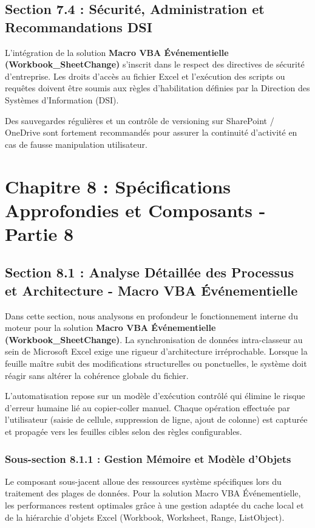 \documentclass[12pt,a4paper]{report}
\begin{document}
\section{Section 7.4 : Sécurité, Administration et Recommandations DSI}
L'intégration de la solution \textbf{Macro VBA Événementielle (Workbook\_SheetChange)} s'inscrit dans le respect des directives de sécurité d'entreprise. Les droits d'accès au fichier Excel et l'exécution des scripts ou requêtes doivent être soumis aux règles d'habilitation définies par la Direction des Systèmes d'Information (DSI).

Des sauvegardes régulières et un contrôle de versioning sur SharePoint / OneDrive sont fortement recommandés pour assurer la continuité d'activité en cas de fausse manipulation utilisateur.


\chapter{Chapitre 8 : Spécifications Approfondies et Composants - Partie 8}

\section{Section 8.1 : Analyse Détaillée des Processus et Architecture - Macro VBA Événementielle}
Dans cette section, nous analysons en profondeur le fonctionnement interne du moteur pour la solution \textbf{Macro VBA Événementielle (Workbook\_SheetChange)}. La synchronisation de données intra-classeur au sein de Microsoft Excel exige une rigueur d'architecture irréprochable. Lorsque la feuille maître subit des modifications structurelles ou ponctuelles, le système doit réagir sans altérer la cohérence globale du fichier.

L'automatisation repose sur un modèle d'exécution contrôlé qui élimine le risque d'erreur humaine lié au copier-coller manuel. Chaque opération effectuée par l'utilisateur (saisie de cellule, suppression de ligne, ajout de colonne) est capturée et propagée vers les feuilles cibles selon des règles configurables.


\subsection{Sous-section 8.1.1 : Gestion Mémoire et Modèle d'Objets}
Le composant sous-jacent alloue des ressources système spécifiques lors du traitement des plages de données. Pour la solution Macro VBA Événementielle, les performances restent optimales grâce à une gestion adaptée du cache local et de la hiérarchie d'objets Excel (Workbook, Worksheet, Range, ListObject).
\end{document}
